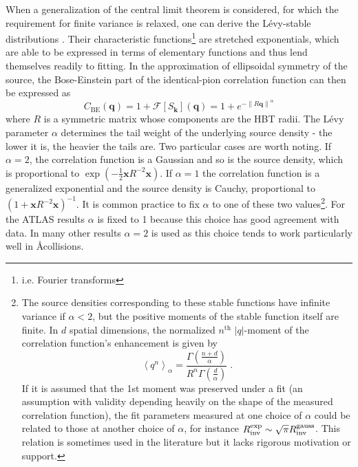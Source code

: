 When a generalization of the central limit theorem is considered, for which the requirement for finite variance is relaxed, one can derive the L\'evy-stable distributions \cite{Csorgo:2003uv}.
Their characteristic functions\footnote{i.e. Fourier transforms} are stretched exponentials, which are able to be expressed in terms of elementary functions and thus lend themselves readily to fitting.
In the approximation of ellipsoidal symmetry of the source, the Bose-Einstein part of the identical-pion correlation function can then be expressed as
\begin{equation} C_{\textrm{BE}}(\mathbf{q}) = 1 + \mathcal{F}[S_\mathbf{k}](\mathbf{q}) = 1 + e^{- \left\lVert R \mathbf{q} \right\rVert^{\alpha} } \end{equation}
where $R$ is a symmetric matrix whose components are the \ac{HBT} radii.
The L\'evy parameter $\alpha$ determines the tail weight of the underlying source density - the lower it is, the heavier the tails are.
Two particular cases are worth noting.
If $\alpha = 2$, the correlation function is a Gaussian and so is the source density, which is proportional to \( \exp\left(-\frac{1}{2} \mathbf{x} R^{-2} \mathbf{x}\right) \).
If $\alpha = 1$ the correlation function is a generalized exponential and the source density is Cauchy, proportional to \( \left( 1 + \mathbf{x} R^{-2} \mathbf{x} \right)^{-1} \).
It is common practice to fix $\alpha$ to one of these two values\footnote{The source densities corresponding to these stable functions have infinite variance if $\alpha < 2$, but the positive moments of the stable function itself are finite.
In $d$ spatial dimensions, the normalized $n^\textrm{th}$ $|q|$-moment of the correlation function's enhancement is given by
\begin{equation}
\left< q^n \right>_{\alpha} = \frac{\Gamma\left(\frac{n+d}{\alpha}\right)}{R^n \Gamma\left(\frac{d}{\alpha}\right)} \; .
\end{equation}
If it is assumed that the 1st moment was preserved under a fit (an assumption with validity depending heavily on the shape of the measured correlation function), the fit parameters measured at one choice of $\alpha$ could be related to those at another choice of $\alpha$, for instance $R_{\mathrm{inv}}^{\textrm{exp}} \sim \sqrt{\pi} R_{\mathrm{inv}}^{\textrm{gauss}}$.
This relation is sometimes used in the literature but it lacks rigorous motivation or support.}.
For the ATLAS \pPb results $\alpha$ is fixed to 1 because this choice has good agreement with data.
In many other results $\alpha = 2$ is used as this choice tends to work particularly well in \AA collisions.

